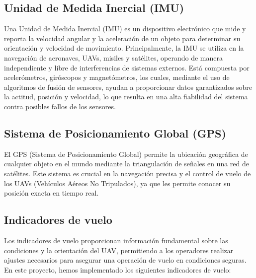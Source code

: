     \subsection{Unidad de Medida Inercial (IMU)}
        Una Unidad de Medida Inercial (IMU) es un dispositivo electrónico que mide y reporta la velocidad angular y la aceleración de un objeto para determinar su orientación y velocidad de movimiento. Principalmente, la IMU se utiliza en la navegación de aeronaves, UAVs, misiles y satélites, operando de manera independiente y libre de interferencias de sistemas externos. Está compuesta por acelerómetros, giróscopos y magnetómetros, los cuales, mediante el uso de algoritmos de fusión de sensores, ayudan a proporcionar datos garantizados sobre la actitud, posición y velocidad, lo que resulta en una alta fiabilidad del sistema contra posibles fallos de los sensores. \cite{IMU}

    

    \subsection{Sistema de Posicionamiento Global (GPS) }
        El GPS (Sistema de Posicionamiento Global) permite la ubicación geográfica de cualquier objeto en el mundo mediante la triangulación de señales en una red de satélites. Este sistema es crucial en la navegación precisa y el control de vuelo de los UAVs (Vehículos Aéreos No Tripulados), ya que les permite conocer su posición exacta en tiempo real. \cite{GPS}

    \subsection{Indicadores de vuelo}
        Los indicadores de vuelo proporcionan información fundamental sobre las condiciones y la orientación del UAV, permitiendo a los operadores realizar ajustes necesarios para asegurar una operación de vuelo en condiciones seguras. En este proyecto, hemos implementado los siguientes indicadores de vuelo:\vspace{5 px}

